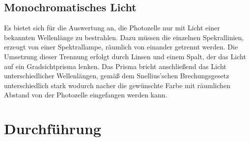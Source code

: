 \subsection{Monochromatisches Licht}
Es bietet sich für die Auswertung an, die Photozelle nur mit Licht einer bekannten Wellenlänge zu bestrahlen.
Dazu müssen die einzelnen Spekrallinien, erzeugt von einer Spektrallampe, räumlich von einander getrennt werden. 
Die Umsetzung dieser Trennung erfolgt durch Linsen und einem Spalt, der das Licht auf ein Gradsichtprisma lenken.
Das Prisma bricht anschließend das Licht unterschiedlicher Wellenlängen, gemäß dem Snellius'schen Brechungsgesetz unterschiedlich 
stark wodurch nacher die gewünschte Farbe mit räumlichen Abstand von der Photozelle eingefangen werden kann.

\section{Durchführung}